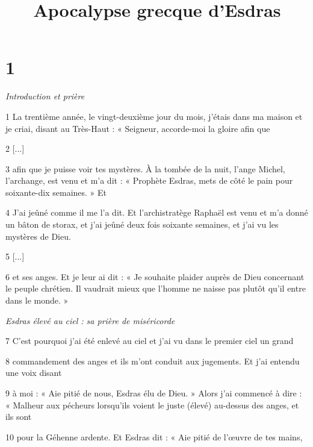 

\title{Apocalypse grecque d'Esdras}

\chapter{1}

\par \textit{Introduction et prière}

\par 1 La trentième année, le vingt-deuxième jour du mois, j'étais dans ma maison et je criai, disant au Très-Haut : « Seigneur, accorde-moi la gloire afin que

\par 2 [...]


\par 3 afin que je puisse voir tes mystères. À la tombée de la nuit, l’ange Michel, l’archange, est venu et m’a dit : « Prophète Esdras, mets de côté le pain pour soixante-dix semaines. » Et

\par 4 J'ai jeûné comme il me l'a dit. Et l'archistratège Raphaël est venu et m'a donné un bâton de storax, et j'ai jeûné deux fois soixante semaines, et j'ai vu les mystères de Dieu.

\par 5 [...]

\par 6 et ses anges. Et je leur ai dit : « Je souhaite plaider auprès de Dieu concernant le peuple chrétien. Il vaudrait mieux que l’homme ne naisse pas plutôt qu’il entre dans le monde. »

\par \textit{Esdras élevé au ciel : sa prière de miséricorde}

\par 7 C'est pourquoi j'ai été enlevé au ciel et j'ai vu dans le premier ciel un grand

\par 8 commandement des anges et ils m'ont conduit aux jugements. Et j'ai entendu une voix disant

\par 9 à moi : « Aie pitié de nous, Esdras élu de Dieu. » Alors j’ai commencé à dire : « Malheur aux pécheurs lorsqu’ils voient le juste (élevé) au-dessus des anges, et ils sont

\par 10 pour la Géhenne ardente. Et Esdras dit : « Aie pitié de l’œuvre de tes mains,

